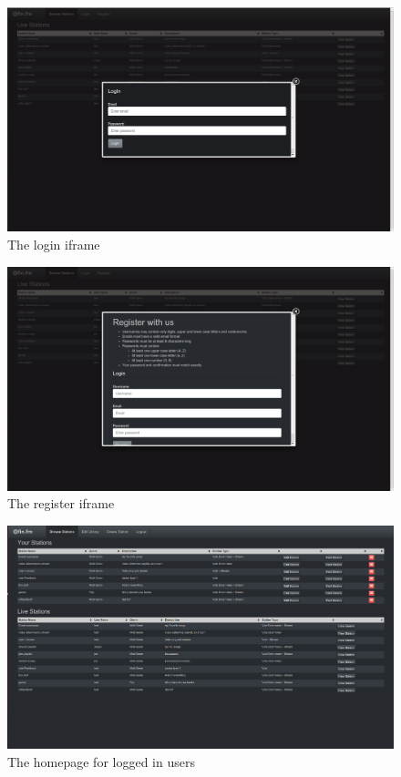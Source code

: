 \documentclass[a4paper, 12pt]{report}
\begin{document}
\begin{figure}[H]
  \centering
    \includegraphics[width=1.0\textwidth]{screenshots/login.png}
    \caption{The login iframe}
    \label{login}
\end{figure}
\begin{figure}[H]
  \centering
    \includegraphics[width=1.0\textwidth]{screenshots/register.png}
    \caption{The register iframe}
    \label{register}
\end{figure}
\begin{figure}[H]
  \centering
    \includegraphics[width=1.0\textwidth]{screenshots/homepage.png}
    \caption{The homepage for logged in users}
    \label{homepage}
\end{figure}
\end{document}

